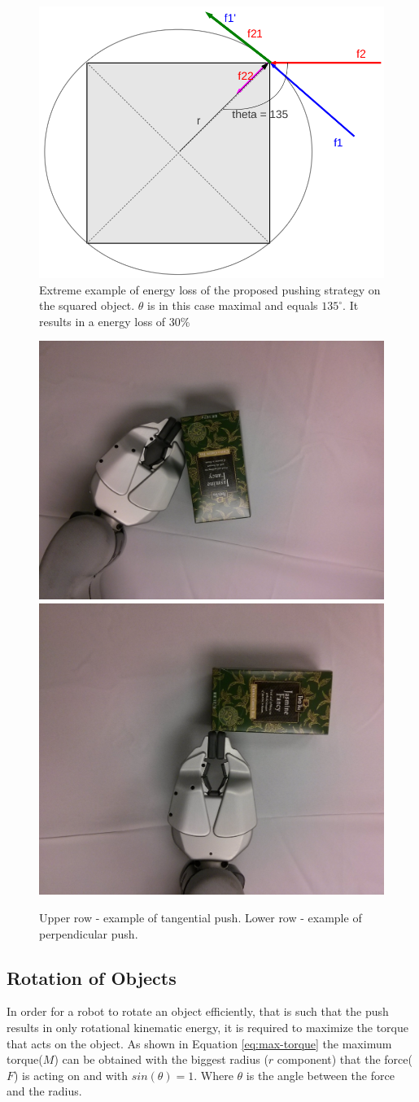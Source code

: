 \begin{figure}
 

\includegraphics[width=0.5\columnwidth]{figures/square-angle.png}


\caption{Extreme example of energy loss of the proposed pushing strategy on the squared object. $\theta$ is in this case maximal and equals $135 ^\circ$. It results in a energy loss of 30\%  }
\label{fig:angles-square}
\end{figure}

\begin{figure}

\includegraphics[width=0.4\columnwidth]{figures/peets-tangential.jpg}\\
\includegraphics[width=0.4\columnwidth]{figures/peets-perpendicular.jpg}\\


\caption{Upper row - example of tangential push. Lower row - example of perpendicular push.}
\label{fig:tangential-example}
\end{figure}


\subsection{Rotation of Objects}
In order for a robot to rotate an object efficiently, that is such that the push results in only rotational kinematic energy, it is required to maximize the torque that acts on the object. As shown in Equation \ref{eq:max-torque} the maximum torque($M$) can be obtained with the biggest radius ($r$ component) that the force($F$) is acting on and with $sin(\theta) = 1$. Where $\theta$ is the angle between the force and the radius.

